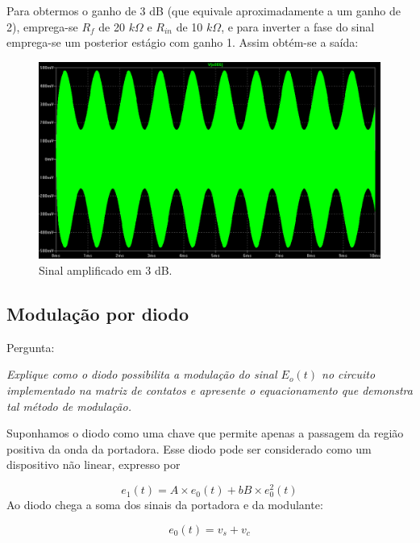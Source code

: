 \documentclass[]{report}
\begin{document}
Para obtermos o ganho de 3 dB (que equivale aproximadamente a um ganho de 2), emprega-se $R_f$ de 20 $k\Omega$ e $R_{in}$ de 10 $k\Omega$, e para inverter a fase do sinal emprega-se um posterior estágio com ganho 1. Assim obtém-se a saída:

\begin{figure}[H]
\begin{center}
\includegraphics[scale=0.15]{./imagens/sinal}
\end{center}
\caption{Sinal amplificado em 3 dB.}
\label{fig:sinal}
\end{figure}


\subsection{Modulação por diodo}
Pergunta: \begin{flushright}
\textit{Explique como o diodo possibilita a modulação do sinal $E_o (t)$ no circuito implementado na matriz de contatos e apresente o equacionamento que demonstra tal método de modulação.}
\end{flushright}

Suponhamos o diodo como uma chave que permite apenas a passagem da região positiva da onda da portadora. Esse diodo pode ser considerado como um dispositivo não linear, expresso por 

\begin{equation}\label{eq_diodo}
e_1(t) = A \times e_0(t) + bB \times e^2_0(t)
\end{equation}
Ao diodo chega a soma dos sinais da portadora e da modulante: 

\begin{equation}\label{eq_soma_sinais}
e_0(t) = v_s + v_c
\end{equation}
\end{document}
